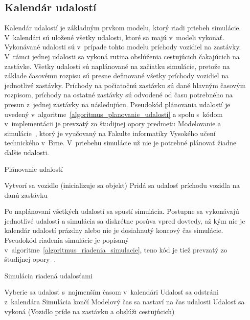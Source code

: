 \subsection*{Kalendár udalostí}
Kalendár udalostí je základným prvkom modelu, ktorý riadi priebeh simulácie.
V~kalendári sú uložené všetky udalosti, ktoré sa majú v~modeli vykonať.
Vykonávané udalosti sú v~prípade tohto modelu príchody vozidiel na zastávky.
V~rámci jednej udalosti sa vykoná rutina obslúženia cestujúcich čakajúcich na zastávke.
Všetky udalosti sú naplánované na začiatku simulácie, pretože na základe časovému rozpisu sú presne definované všetky príchody vozidiel na jednotlivé zastávky.
Príchody na počiatočnú zastávku sú dané hlavným časovým rozpisom, príchody na ostatné zastávky sú odvodené od času potrebného na presun z~jednej zastávky na následujúcu. %
Pseudokód plánovania udalostí je uvedený v~algoritme~\ref{algoritmus_planovanie_udalosti} a spolu s~kódom v~implementácii je prevzatý zo študijnej opory predmetu Modelovanie a simulácie~\cite{peringer2022ims}, ktorý je vyučovaný na Fakulte informatiky Vysokého učení technického v~Brne.
V~priebehu simulácie už nie je potrebné plánovať žiadne ďalšie udalosti.

\vspace*{\dimexpr0.5\baselineskip\relax}
\begin{algorithm}[H]\label{algoritmus_planovanie_udalosti}
  \caption{Plánovanie udalostí}
     {
      Vytvorí sa vozidlo (inicializuje sa objekt)\;
       {
        Pridá sa udalosť príchodu vozidla na danú zastávku\;
      }
    }
\end{algorithm}
\vspace*{\dimexpr0.5\baselineskip\relax}

Po naplánovaní všetkých udalostí sa spustí simulácia.
Postupne sa vykonávajú jednotlivé udalosti a simulácia sa diskrétne posúva vpred dovtedy, až kým nie je kalendár udalostí prázdny alebo nie je dosiahnutý koncový čas simulácie.
Pseudokód riadenia simulácie je popísaný v~algoritme~\ref{algoritmus_riadenia_simulacie}, teno kód je tiež prevzatý zo študijnej opory~\cite{peringer2022ims}.

\vspace*{\dimexpr0.5\baselineskip\relax}
\begin{algorithm}[H]\label{algoritmus_riadenia_simulacie}
\caption{Simulácia riadená udalosťami}
   {
    Vyberie sa udalosť s~najmenším časom v~kalendári\;
    Udalosť sa odstráni z~kalendára\;
     {
      Simulácia končí\;
    }
    Modelový čas sa nastaví na čas udalosti\;
    Udalosť sa vykoná (Vozidlo príde na zastávku a obslúži cestujúcich)\;
  }
\end{algorithm}
\vspace*{\dimexpr0.5\baselineskip\relax}

